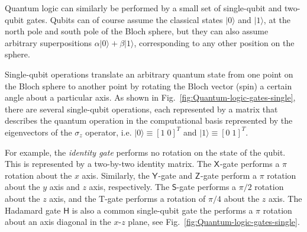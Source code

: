 \documentclass[aip,apr,twocolumn,showpacs,superscriptaddress,groupedaddress,nofootinbib,reprint]{revtex4-1}  %
\newcommand{\X}[1]{\textsf{X}_{#1}}
\newcommand{\Y}[1]{\textsf{Y}_{#1}}
\newcommand{\Z}[1]{\textsf{Z}_{#1}}
\begin{document}
Quantum logic can similarly be performed by a small set of single-qubit and two-qubit gates. Qubits can of course assume the classical states $\vert 0 \rangle$ and $\vert 1 \rangle$, at the north pole and south pole of the Bloch sphere, but they can also assume arbitrary superpositions $\alpha \vert 0 \rangle + \beta \vert 1 \rangle$, corresponding to any other position on the sphere.

Single-qubit operations translate an arbitrary quantum state from one point on the Bloch sphere to another point by rotating the Bloch vector (spin) a certain angle about a particular axis. As shown in Fig.~\ref{fig:Quantum-logic-gates-single}, there are several single-qubit operations, each represented by a matrix that describes the quantum operation in the computational basis represented by the eigenvectors of the $\sigma_z$ operator, i.e. $\vert 0 \rangle \equiv [ 1 \; 0 ]^T$ and $\vert 1 \rangle \equiv [ 0 \; 1 ]^T$.

For example, the \textit{identity gate} performs no rotation on the state of the qubit. This is represented by a two-by-two identity matrix. The $\X{}$-gate performs a $\pi$ rotation about the $x$ axis. Similarly, the $\Y{}$-gate and $\Z{}$-gate perform a $\pi$ rotation about the $y$ axis and $z$ axis, respectively. The $\textsf{S}$-gate performs a $\pi/2$ rotation about the $z$ axis, and the $\text{T}$-gate performs a rotation of $\pi/4$ about the $z$ axis. The Hadamard gate $\textsf{H}$ is also a common single-qubit gate the performs a $\pi$ rotation about an axis diagonal in the $x$-$z$ plane, see Fig.~\ref{fig:Quantum-logic-gates-single}.
\end{document}

